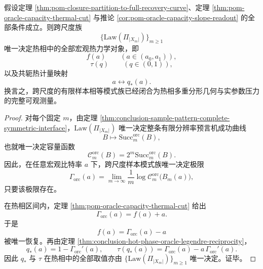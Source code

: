 \begin{theorem}[样本模式族对热相热力学的闭包]\label{thm:conclusion-sample-pattern-family-closes-hot-thermodynamics}
假设定理 \ref{thm:pom-closure-partition-to-full-recovery-curve}、定理 \ref{thm:pom-oracle-capacity-thermal-cut} 与推论 \ref{cor:pom-oracle-capacity-slope-readout} 的全部条件成立。则跨尺度族
\[
\bigl\{\mathrm{Law}(\Pi_{|X_m|})\bigr\}_{m\ge 1}
\]
唯一决定热相中的全部宏观热力学对象，即
\[
f(a)\qquad (a\in(a_0,a_1)),
\]
\[
\tau(q)\qquad (q\in(0,1)),
\]
以及共轭热计量映射
\[
a\longleftrightarrow q_\ast(a).
\]
换言之，跨尺度的有限样本相等模式族已经闭合为热相多重分形几何与实参数压力的完整可观测量。
\end{theorem}
\begin{proof}
对每个固定 \(m\)，由定理 \ref{thm:conclusion-sample-pattern-complete-symmetric-interface}，\(\mathrm{Law}(\Pi_{|X_m|})\) 唯一决定整条有限分辨率预言机成功曲线
\[
B\longmapsto \mathrm{Succ}^{\mathrm{orc}}_m(B),
\]
也就唯一决定容量函数
\[
\mathcal C_m^{\mathrm{orc}}(B)=2^m\mathrm{Succ}^{\mathrm{orc}}_m(B).
\]
因此，在任意宏观比特率 \(a\) 下，跨尺度样本模式族唯一决定极限
\[
\Gamma_{\mathrm{orc}}(a)
=
\lim_{m\to\infty}\frac1m\log \mathcal C_m^{\mathrm{orc}}\bigl(B_m(a)\bigr),
\]
只要该极限存在。

在热相区间内，定理 \ref{thm:pom-oracle-capacity-thermal-cut} 给出
\[
\Gamma_{\mathrm{orc}}(a)=f(a)+a.
\]
于是
\[
f(a)=\Gamma_{\mathrm{orc}}(a)-a
\]
被唯一恢复。再由定理 \ref{thm:conclusion-hot-phase-oracle-legendre-reciprocity}，
\[
q_\ast(a)=1-\Gamma_{\mathrm{orc}}'(a),
\qquad
\tau(q_\ast(a))
=
\Gamma_{\mathrm{orc}}(a)-a\,\Gamma_{\mathrm{orc}}'(a).
\]
因此 \(q_\ast\) 与 \(\tau\) 在热相中的全部取值亦由 \(\{\mathrm{Law}(\Pi_{|X_m|})\}_{m\ge1}\) 唯一决定。证毕。
\end{proof}

